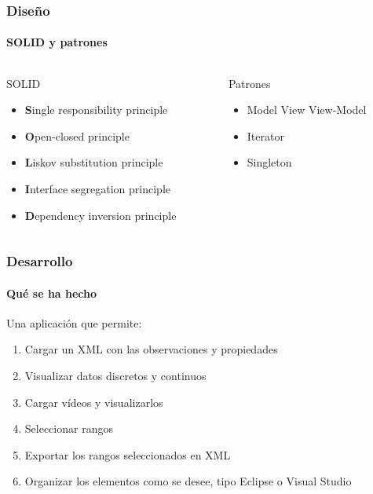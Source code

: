 \begin{frame}
	\frametitle{Dise\~no}
	\framesubtitle{SOLID y patrones}
	\begin{columns}[T]
		
		\begin{column}[T]{0.5\linewidth}
			\begin{block}{SOLID}
				\begin{itemize}
					\item \textbf{S}ingle responsibility principle
					\item \textbf{O}pen-closed principle
					\item \textbf{L}iskov substitution principle
					\item \textbf{I}nterface segregation principle
					\item \textbf{D}ependency inversion principle
				\end{itemize}
			\end{block}
		\end{column}
		
		\begin{column}[T]{0.5\linewidth}
			\begin{block}{Patrones}
				\begin{itemize}
					\item Model View View-Model
					\item Iterator
					\item Singleton
				\end{itemize}
			\end{block}
		\end{column}
		
	\end{columns}

\end{frame}

\begin{frame}
	\frametitle{Desarrollo}
	\framesubtitle{Qu\'e se ha hecho}
	Una aplicaci\'on que permite:
	\begin{enumerate}
		\item Cargar un XML con las observaciones y propiedades
		\item Visualizar datos discretos y continuos
		\item Cargar v\'ideos y visualizarlos
		\item Seleccionar rangos
		\item Exportar los rangos seleccionados en XML
		\item Organizar los elementos como se desee, tipo Eclipse o Visual 
		Studio
	\end{enumerate}
	
\end{frame}


